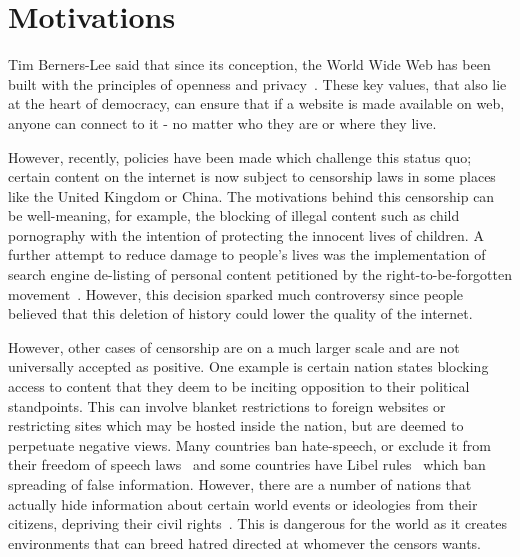 \documentclass[ %
                    author={Samuel Russell},
                supervisor={Prof. Bogdan Warinschi},
                    degree={MEng},
                     title={Innocuous Ciphertexts},
                  subtitle={The DE-CENSOR Scheme},
                      type={research},
                      year={2018} ]{dissertation}
\begin{document}
\mainmatter


\chapter{Motivations}
\label{chap:context}

Tim Berners-Lee said that since its conception, the World Wide Web has been built with the principles of openness and privacy~\cite{gard}. These key values, that also lie at the heart of democracy, can ensure that if a website is made available on web, anyone can connect to it - no matter who they are or where they live. 

However, recently, policies have been made which challenge this status quo; certain content on the internet is now subject to censorship laws in some places like the United Kingdom or China. The motivations behind this censorship can be well-meaning, for example, the blocking of illegal content such as child pornography with the intention of protecting the innocent lives of children. A further attempt to reduce damage to people's lives was the implementation of search engine de-listing of personal content petitioned by the right-to-be-forgotten movement~\cite{rtbf}. However, this decision sparked much controversy since people believed that this deletion of history could lower the quality of the internet. 

However, other cases of censorship are on a much larger scale and are not universally accepted as positive. One example is certain nation states blocking access to content that they deem to be inciting opposition to their political standpoints. This can involve blanket restrictions to foreign websites or restricting sites which may be hosted inside the nation, but are deemed to perpetuate negative views. Many countries ban hate-speech, or exclude it from their freedom of speech laws~\cite{hate} and some countries have Libel rules~\cite{libel} which ban spreading of false information. However, there are a number of nations that actually hide information about certain world events or ideologies from their citizens, depriving their civil rights~\cite{chincensor}. This is dangerous for the world as it creates environments that can breed hatred directed at whomever the censors wants.
\end{document}
